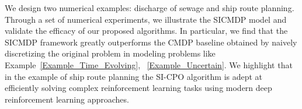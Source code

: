 We design two numerical examples: discharge of sewage and ship route planning.
Through a set of numerical experiments, we illustrate the SICMDP model and validate the efficacy of our proposed algorithms.
In particular, we find that the SICMDP framework greatly outperforms the CMDP baseline obtained by naively discretizing the original problem in modeling problems like Example~\ref{Example_Time_Evolving}, ~\ref{Example_Uncertain}.
We highlight that in the example of ship route planning the SI-CPO algorithm is adept at efficiently solving complex reinforcement learning tasks using modern deep reinforcement learning approaches.
